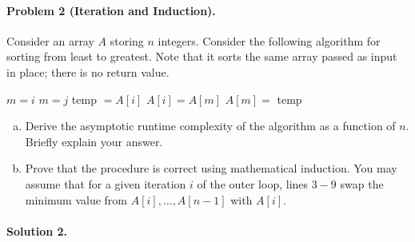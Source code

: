 \documentclass[11pt]{article}
\begin{document}

\newpage
\paragraph{Problem 2 (Iteration and Induction).}
Consider an array $A$ storing $n$ integers. Consider the following algorithm 
for sorting from least to greatest. Note that it sorts the same array passed 
as input in place; there is no return value.

\begin{algorithmic}[1]
        \State $m = i$
                \State $m = j$
            \EndIf
        \EndFor
        \State temp $=A[i]$
        \State $A[i] = A[m]$
        \State $A[m] =$ temp
    \EndFor
\EndProcedure
\end{algorithmic}

\begin{enumerate}[(a)]
    \item Derive the asymptotic runtime complexity of the  
        algorithm as a function of $n$. Briefly explain your answer.
    
    \item Prove that the  procedure is correct using mathematical 
        induction. You may assume that for a given iteration $i$ of the outer 
        loop, lines $3-9$ swap the minimum value from $A[i], \dots, A[n-1]$ 
        with $A[i]$.
\end{enumerate}


\paragraph{Solution 2.}
\end{document}
